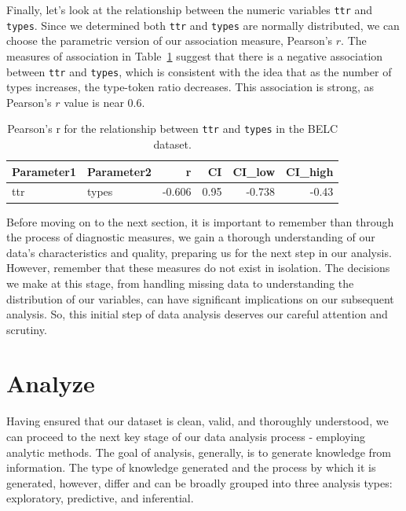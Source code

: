 \documentclass[
  letterpaper,
  DIV=11,
  numbers=noendperiod]{scrreport}
\theoremstyle{definition}
\theoremstyle{remark}
\begin{document}
Finally, let's look at the relationship between the numeric variables
\texttt{ttr} and \texttt{types}. Since we determined both \texttt{ttr}
and \texttt{types} are normally distributed, we can choose the
parametric version of our association measure, Pearson's \(r\). The
measures of association in Table~\ref{tbl-aa-pearson-2} suggest that
there is a negative association between \texttt{ttr} and \texttt{types},
which is consistent with the idea that as the number of types increases,
the type-token ratio decreases. This association is strong, as Pearson's
\(r\) value is near 0.6.

\hypertarget{tbl-aa-pearson-2}{}
\begin{table}
\caption{\label{tbl-aa-pearson-2}Pearson's r for the relationship between \texttt{ttr} and \texttt{types}
in the BELC dataset. }\tabularnewline

\centering
\begin{tabular}{l|l|r|r|r|r}
\hline
Parameter1 & Parameter2 & r & CI & CI\_low & CI\_high\\
\hline
ttr & types & -0.606 & 0.95 & -0.738 & -0.43\\
\hline
\end{tabular}
\end{table}

Before moving on to the next section, it is important to remember than
through the process of diagnostic measures, we gain a thorough
understanding of our data's characteristics and quality, preparing us
for the next step in our analysis. However, remember that these measures
do not exist in isolation. The decisions we make at this stage, from
handling missing data to understanding the distribution of our
variables, can have significant implications on our subsequent analysis.
So, this initial step of data analysis deserves our careful attention
and scrutiny.

\hypertarget{sec-aa-analyze}{%
\section{Analyze}\label{sec-aa-analyze}}

Having ensured that our dataset is clean, valid, and thoroughly
understood, we can proceed to the next key stage of our data analysis
process - employing analytic methods. The goal of analysis, generally,
is to generate knowledge from information. The type of knowledge
generated and the process by which it is generated, however, differ and
can be broadly grouped into three analysis types: exploratory,
predictive, and inferential.
\end{document}
